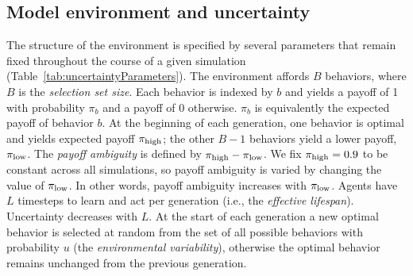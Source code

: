 \documentclass[letterpaper,11.5pt]{scrartcl}
\begin{document}
\subsection{Model environment and uncertainty}

The structure of the environment is specified by several parameters that remain fixed throughout the course of a given simulation (Table~\ref{tab:uncertaintyParameters}).  %
The environment affords $B$ behaviors, where
$B$ is the \emph{selection set size}.
Each behavior is indexed by $b$ and 
yields a payoff 
of 1 with probability $\pi_b$ and a payoff of 0 otherwise. %
$\pi_b$ is equivalently the expected
payoff of behavior $b$.  
At the beginning of each generation, one behavior is optimal and yields expected
payoff $\pi_{\mathrm{high}}$; the other $B-1$ behaviors yield a lower payoff, $\pi_{\mathrm{low}}$. 
The \emph{payoff ambiguity} is defined by $\pi_{\mathrm{high}} - \pi_{\mathrm{low}}$. 
We fix $\pi_{\mathrm{high}} = 0.9$ to be constant across all simulations, so 
payoff ambiguity is varied by changing the value of $\pi_{\mathrm{low}}$. In other words, payoff ambiguity increases with $\pi_{\mathrm{low}}$.  Agents have $L$ timesteps to learn and act per generation (i.e., the \emph{effective lifespan}). Uncertainty decreases with $L$. At the start of each generation a new optimal behavior is selected at random from the set of all possible behaviors with probability $u$ (the \emph{environmental variability}), otherwise the optimal behavior remains unchanged from the previous generation. 
\end{document}
